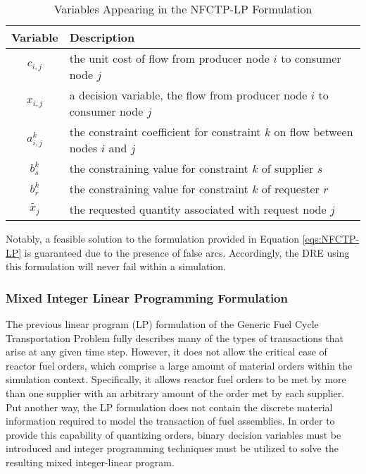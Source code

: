 \begin{table} [h!]
\centering
\begin{tabularx}{\columnwidth-10pt}{|c|X|} %
\hline
Variable    & Description \\
\hline
$c_{i,j}$             & the unit cost of flow
                          from producer node $i$ to consumer node $j$  \\
$x_{i,j}$             & a decision variable, the flow 
                          from producer node $i$ to consumer node $j$  \\
$a_{i,j}^k$ & the constraint coefficient for constraint $k$ 
                          on flow between nodes $i$ and $j$  \\
$b_s^k$   & the constraining value for constraint $k$ of supplier $s$ \\
$b_r^k$   & the constraining value for constraint $k$ of requester $r$ \\
$\tilde{x_j}$ & the requested quantity associated with request node $j$ \\
\hline
\end{tabularx}
\caption{Variables Appearing in the NFCTP-LP Formulation}
\label{tbl:NFCTP-LP-vars}
\end{table}

Notably, a feasible solution to the formulation provided in Equation
\ref{eqs:NFCTP-LP} is guaranteed due to the presence of false arcs. Accordingly,
the DRE using this formulation will never fail within a simulation.

\subsubsection{Mixed Integer Linear Programming Formulation}\label{abm:dre:milp}

The previous linear program (LP) formulation of the Generic Fuel Cycle
Transportation Problem fully describes many of the types of transactions that
arise at any given time step. However, it does not allow the critical case of
reactor fuel orders, which comprise a large amount of material orders within the
simulation context. Specifically, it allows reactor fuel orders to be met by
more than one supplier with an arbitrary amount of the order met by each
supplier. Put another way, the LP formulation does not contain the discrete
material information required to model the transaction of fuel assemblies. In
order to provide this capability of quantizing orders, binary decision variables
must be introduced and integer programming techniques must be utilized to solve
the resulting mixed integer-linear program.

